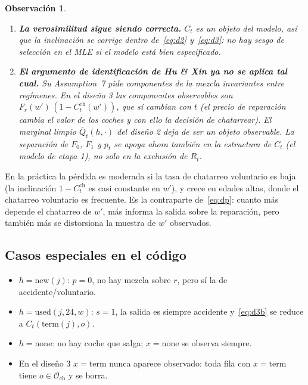 \documentclass[11pt]{article}
\newcommand{\term}{\mathrm{term}}
\newcommand{\none}{\mathrm{none}}
\newcommand{\used}{\mathrm{used}}
\newcommand{\new}{\mathrm{new}}
\newcommand{\1}{\mathbf{1}}
\newcommand{\Osc}{\mathcal{O}_{\mathrm{ch}}}
\newcommand{\Qbar}{\bar Q}
\newtheorem*{obs}{Observación}
\begin{document}
\begin{obs}
\begin{enumerate}
  \item \textbf{La verosimilitud sigue siendo correcta.} $C_t$ es un objeto del modelo, así que
  la inclinación se corrige dentro de~\eqref{eq:d2} y~\eqref{eq:d3}: no hay sesgo de
  selección en el MLE si el modelo está bien especificado.
  \item \textbf{El argumento de identificación de Hu \& Xin ya no se aplica tal cual.} Su
  Assumption~7 pide componentes de la mezcla invariantes entre regímenes. En el diseño 3 las
  componentes observables son $F_r(w')\,(1-C^{\text{ch}}_t(w'))$, que sí cambian con $t$
  (el precio de reparación cambia el valor de los coches y con ello la decisión de
  chatarrear). El marginal limpio $\Qbar_t(h,\cdot)$ del diseño 2 deja de ser un objeto
  observable. La separación de $F_0$, $F_1$ y $p_t$ se apoya ahora también en la estructura
  de $C_t$ (el modelo de etapa 1), no solo en la exclusión de $R_t$.
\end{enumerate}
\end{obs}

En la práctica la pérdida es moderada si la tasa de chatarreo voluntario es baja (la
inclinación $1-C^{\text{ch}}_t$ es casi constante en $w'$), y crece en edades altas, donde
el chatarreo voluntario es frecuente. Es la contraparte de~\eqref{eq:dp}: cuanto más
depende el chatarreo de $w'$, más informa la salida sobre la reparación, pero también más
se distorsiona la muestra de $w'$ observados.

\subsection{Casos especiales en el código}

\begin{itemize}
  \item $h=\new(j)$: $p=0$, no hay mezcla sobre $r$, pero sí la de accidente/voluntario.
  \item $h=\used(j,24,w)$: $s=1$, la salida es siempre accidente y~\eqref{eq:d3b} se reduce
  a $C_t(\term(j),o)$.
  \item $h=\none$: no hay coche que salga; $x=\none$ se observa siempre.
  \item En el diseño 3 $x=\term$ nunca aparece observado: toda fila con $x=\term$ tiene
  $o\in\Osc$ y se borra.
\end{itemize}

\end{document}
